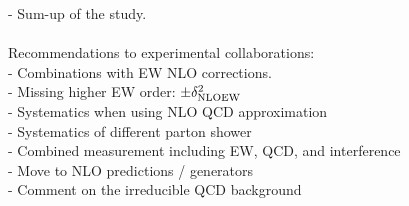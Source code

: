 
- Sum-up of the study. \\

 \\
Recommendations to experimental collaborations: \\
- Combinations with EW NLO corrections. \\
- Missing higher EW order: $\pm \delta^2_{\rm NLO EW}$ \\
- Systematics when using NLO QCD approximation \\
- Systematics of different parton shower \\
- Combined measurement including  EW, QCD, and interference \\
- Move to NLO predictions / generators \\
- Comment on the irreducible QCD background \\